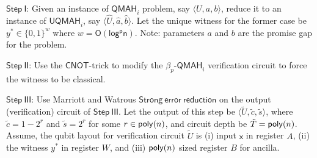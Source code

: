 \documentclass[11pt]{article}
\newcommand{\ms}[1]{\mathsf{#1}}
\begin{document}
$\mathsf{Step\ I}$: Given an instance of $\ms{QMAH}_i$ problem, say $\langle U,a,b \rangle$, reduce it to an instance of $\ms{UQMAH}_i$, say $\langle \hat{U},\hat{a},\hat{b} \rangle$. Let the unique witness for the former case be $y^*\in\{0,1\}^{w}$ where $w=\mathsf{O(log^p n)}$. Note: parameters $a$ and $b$ are the promise gap for the problem. \newline

$\mathsf{Step\ II}$: Use the $\mathsf{CNOT}$-trick to modify the $\beta_p$-$\ms{QMAH}_i$ verification circuit to force the witness to be classical. \newline

$\mathsf{Step\ III}$: Use Marriott and Watrous $\mathsf{Strong\ error\ reduction}$ on the output (verification) circuit of $\mathsf{Step\ III}$. Let the output of this step be $\langle \tilde{U},\tilde{c}, \tilde{s} \rangle$, where $\tilde{c} =1-2^r$ and $\tilde{s}=2^r$ for some $r\in \mathsf{poly}(n)$, and circuit depth be $\tilde{T}=\mathsf{poly}(n)$. Assume, the qubit layout for verification circuit $\tilde{U}$ is (i) input $\mathsf{x}$ in register $A$, (ii) the witness $y^*$ in register $W$, and (iii) $\mathsf{poly}(n)$ sized register $B$ for ancilla.  \bigskip
\end{document}

